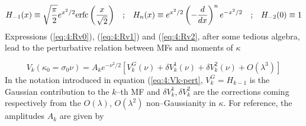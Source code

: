\begin{equation}
\label{eq:4:hermite}
\begin{matrix}
\displaystyle H_{-1}(x) \equiv \sqrt{\frac{\pi}{2}}e^{x^2/2}{\rm erfc}\left(\frac{x}{\sqrt{2}}\right) & ; & \displaystyle H_n(x) \equiv e^{x^2/2}\left(-\frac{d}{dx}\right)^n e^{-x^2/2} & ; & H_{-2}(0)\equiv 1 
\end{matrix}
\end{equation}
%
Expressions (\ref{eq:4:Rv0}), (\ref{eq:4:Rv1}) and (\ref{eq:4:Rv2}, after some tedious algebra, lead to the perturbative relation between MFs and moments of $\kappa$

\begin{equation}
\label{eq:4:Vk-pert}
V_k(\kappa_0=\sigma_0\nu) = A_k e^{-\nu^2/2}\left[V_k^G(\nu)+\delta V^1_k(\nu) + \delta V^2_k(\nu) + O(\lambda^3)\right] 
\end{equation}
%
In the notation introduced in equation (\ref{eq:4:Vk-pert}, $V_k^G=H_{k-1}$ is the Gaussian contribution to the $k$--th MF and $\delta V^1_k,\delta V^2_k$ are the corrections coming respectively from the $O(\lambda)$, $O(\lambda^2)$ non--Gaussianity in $\kappa$. For reference, the amplitudes $A_k$ are given by 

